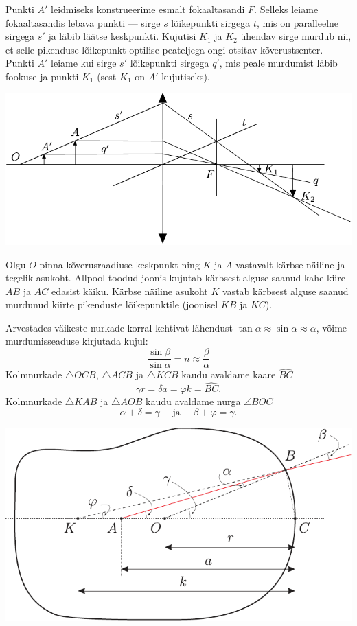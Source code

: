 \documentclass[10pt]{article}
\begin{document}
{Punkti $A'$ leidmiseks konstrueerime esmalt fokaaltasandi $F$. Selleks leiame fokaaltasandis lebava punkti --- sirge $s$ lõikepunkti sirgega $t$, mis on paralleelne sirgega $s'$ ja läbib läätse keskpunkti. Kujutisi $K_1$ ja $K_2$ ühendav sirge murdub nii, et selle pikenduse lõikepunkt optilise peateljega ongi otsitav kõverustsenter. Punkti $A'$ leiame kui sirge $s'$ lõikepunkti sirgega $q'$, mis peale murdumist läbib fookuse ja punkti $K_1$ (sest $K_1$ on $A'$ kujutiseks).


\begin{center}
	\includegraphics[width=\linewidth]{2007-v3g-09-lah}
\end{center}
\probend
\bigskip


\solu
Olgu $O$ pinna kõverusraadiuse keskpunkt ning $K$ ja $A$ vastavalt kärbse näiline ja tegelik asukoht. Allpool toodud joonis kujutab kärbsest alguse saanud kahe kiire $AB$ ja $AC$ edasist käiku. Kärbse näiline asukoht $K$ vastab kärbsest alguse saanud murdunud kiirte pikenduste lõikepunktile (joonisel $KB$ ja $KC$).

Arvestades väikeste nurkade korral kehtivat lähendust $\tan \alpha \approx \sin \alpha \approx \alpha$, võime murdumisseaduse kirjutada kujul:
\[
\frac{\sin \beta}{\sin \alpha}=n \approx \frac{\beta}{\alpha}
\]
Kolmnurkade $\triangle OCB$, $\triangle ACB$ ja $\triangle KCB$ kaudu avaldame kaare $\widehat{BC}$
\[
\gamma r=\delta a=\varphi k=\widehat{BC}.
\]
Kolmnurkade $\triangle KAB$ ja $\triangle AOB$ kaudu avaldame nurga $\angle BOC$
\[
\alpha+\delta=\gamma \quad \text { ja } \quad \beta+\varphi=\gamma.
\]

\begin{center}
	\includegraphics[width=\linewidth]{2008-v2g-10-lah}
\end{center}

}
\end{document}

